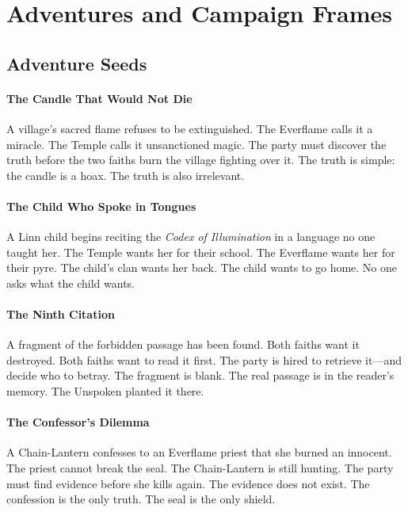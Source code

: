 \documentclass{book}
\begin{document}
\part{Adventures and Campaign Frames}

\chapter{Adventure Seeds}

\subsection{The Candle That Would Not Die}

A village's sacred flame refuses to be extinguished. The Everflame calls it a miracle. The Temple calls it unsanctioned magic. The party must discover the truth before the two faiths burn the village fighting over it. The truth is simple: the candle is a hoax. The truth is also irrelevant.

\subsection{The Child Who Spoke in Tongues}

A Linn child begins reciting the \textit{Codex of Illumination} in a language no one taught her. The Temple wants her for their school. The Everflame wants her for their pyre. The child's clan wants her back. The child wants to go home. No one asks what the child wants.

\subsection{The Ninth Citation}

A fragment of the forbidden passage has been found. Both faiths want it destroyed. Both faiths want to read it first. The party is hired to retrieve it---and decide who to betray. The fragment is blank. The real passage is in the reader's memory. The Unspoken planted it there.

\subsection{The Confessor's Dilemma}

A Chain-Lantern confesses to an Everflame priest that she burned an innocent. The priest cannot break the seal. The Chain-Lantern is still hunting. The party must find evidence before she kills again. The evidence does not exist. The confession is the only truth. The seal is the only shield.
\end{document}
